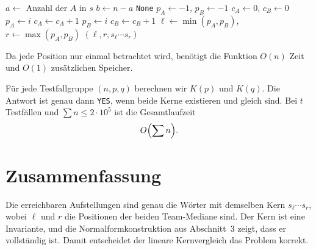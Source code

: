 \documentclass[11pt,a4paper]{article}
\newcommand{\YES}{\texttt{YES}}
\begin{document}
\begin{algorithm}[H]
\caption{Kern eines Zustands}
\begin{algorithmic}[1]
  \State $a\gets$ Anzahl der $A$ in $s$
  \State $b\gets n-a$
    \State \Return \texttt{None}
  \EndIf
  \State $p_A\gets -1$, $p_B\gets -1$
  \State $c_A\gets 0$, $c_B\gets 0$
        \State $p_A\gets i$
      \EndIf
      \State $c_A\gets c_A+1$
    \Else
        \State $p_B\gets i$
      \EndIf
      \State $c_B\gets c_B+1$
    \EndIf
  \EndFor
  \State $\ell\gets\min(p_A,p_B)$, $r\gets\max(p_A,p_B)$
  \State \Return $(\ell,r,s_{\ell}\cdots s_r)$
\EndFunction
\end{algorithmic}
\end{algorithm}

Da jede Position nur einmal betrachtet wird, ben\"otigt die Funktion
$O(n)$ Zeit und $O(1)$ zus\"atzlichen Speicher.

F\"ur jede Testfallgruppe $(n,p,q)$ berechnen wir $K(p)$ und $K(q)$.
Die Antwort ist genau dann \YES, wenn beide Kerne existieren und gleich
sind.  Bei $t$ Testf\"allen und $\sum n\le 2\cdot10^5$ ist die
Gesamtlaufzeit
\[
O\Bigl(\sum n\Bigr).
\]

\section{Zusammenfassung}

Die erreichbaren Aufstellungen sind genau die W\"orter mit demselben
Kern $s_{\ell}\cdots s_r$, wobei $\ell$ und $r$ die Positionen der
beiden Team-Mediane sind.  Der Kern ist eine Invariante, und die
Normalformkonstruktion aus Abschnitt~3 zeigt, dass er vollst\"andig
ist.  Damit entscheidet der lineare Kernvergleich das Problem korrekt.
\end{document}

